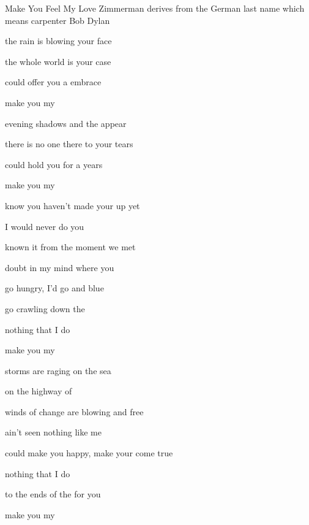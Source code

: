 \begin{SBSong}{Make You Feel My Love}
  {Zimmerman derives from the German last name which means carpenter}
  {Bob Dylan}
  \begin{SBVerse} 
     the rain is blowing  your face
    
     the whole world is  your case
    
     could offer you a  embrace
    
     make you  my 
  \end{SBVerse}
  \begin{SBVerse}
     evening shadows and the  appear
    
     there is no one there to  your tears
    
     could hold you for a  years
    
     make you  my 

     know you haven't made your  up yet
    
     I would never do you 
    
     known it from the moment  we met
    
     doubt in my mind where you 
  \end{SBVerse}
  
  \begin{SBVerse}
     go hungry, I'd go  and blue
    
     go crawling down the 
    
     nothing that I  do
    
     make you  my 

     storms are raging on the  sea
    
     on the highway of 
    
     winds of change are blowing  and free
    
     ain't seen nothing like me 
  \end{SBVerse}
  \begin{SBVerse}
     could make you happy, make your  come true
    
     nothing that I  do
    
     to the ends of the  for you
    
     make you  my 
  \end{SBVerse}
\end{SBSong}
